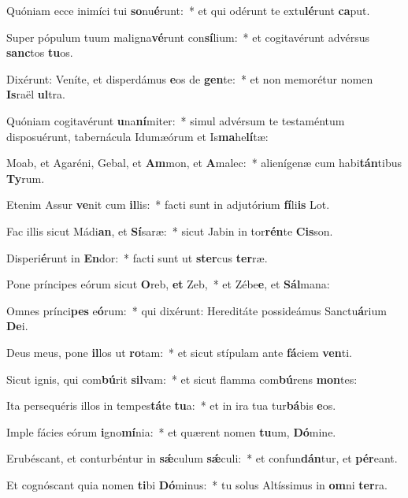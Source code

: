 \item Quóniam ecce inimíci tui \textbf{so}nu\textbf{é}runt:~* et qui odérunt te extu\textbf{lé}runt \textbf{ca}put.
\item Super pópulum tuum maligna\textbf{vé}runt con\textbf{sí}lium:~* et cogitavérunt advérsus \textbf{sanc}tos \textbf{tu}os.
\item Dixérunt: Veníte, et disperdámus \textbf{e}os de \textbf{gen}te:~* et non memorétur nomen \textbf{Is}raël \textbf{ul}tra.
\item Quóniam cogitavérunt \textbf{u}na\textbf{ní}miter:~* simul advérsum te testaméntum disposuérunt, tabernácula Idumæórum et Is\textbf{ma}he\textbf{lí}tæ:
\item Moab, et Agaréni, Gebal, et \textbf{Am}mon, et \textbf{A}malec:~* alienígenæ cum habi\textbf{tán}tibus \textbf{Ty}rum.
\item Etenim Assur \textbf{ve}nit cum \textbf{il}lis:~* facti sunt in adjutórium \textbf{fí}li\textbf{is} Lot.
\item Fac illis sicut Mádi\textbf{an}, et \textbf{Sí}saræ:~* sicut Jabin in tor\textbf{rén}te \textbf{Cis}son.
\item Disperi\textbf{é}runt in \textbf{En}dor:~* facti sunt ut \textbf{ster}cus \textbf{ter}ræ.
\item Pone príncipes eórum sicut \textbf{O}reb, \textbf{et} Zeb,~* et Zébe\textbf{e}, et \textbf{Sál}mana:
\item Omnes prínci\textbf{pes} e\textbf{ó}rum:~* qui dixérunt: Hereditáte possideámus Sanctu\textbf{á}rium \textbf{De}i.
\item Deus meus, pone \textbf{il}los ut \textbf{ro}tam:~* et sicut stípulam ante \textbf{fá}ciem \textbf{ven}ti.
\item Sicut ignis, qui com\textbf{bú}rit \textbf{sil}vam:~* et sicut flamma com\textbf{bú}rens \textbf{mon}tes:
\item Ita persequéris illos in tempes\textbf{tá}te \textbf{tu}a:~* et in ira tua tur\textbf{bá}bis \textbf{e}os.
\item Imple fácies eórum \textbf{i}gno\textbf{mí}nia:~* et quærent nomen \textbf{tu}um, \textbf{Dó}mine.
\item Erubéscant, et conturbéntur in \textbf{sǽ}culum \textbf{sǽ}culi:~* et confun\textbf{dán}tur, et \textbf{pér}eant.
\item Et cognóscant quia nomen \textbf{ti}bi \textbf{Dó}minus:~* tu solus Altíssimus in \textbf{om}ni \textbf{ter}ra.
